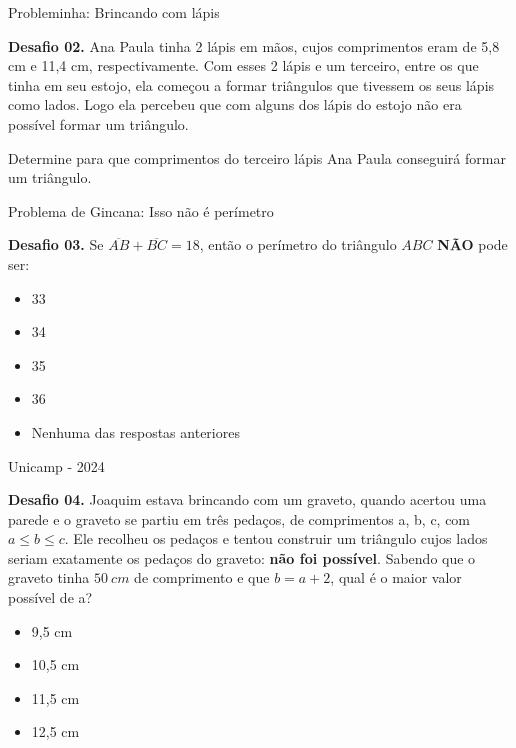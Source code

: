 \documentclass[12pt]{beamer}
\begin{document}
\begin{frame}{Probleminha: Brincando com lápis}
	
	\begin{exampleblock}{\textbf{Desafio 02.}}
		\justifying
		Ana Paula tinha 2 lápis em mãos, cujos comprimentos eram de 5,8 cm e 11,4 cm, respectivamente. Com esses 2 lápis e um terceiro, entre os que tinha em seu estojo, ela começou a formar triângulos que tivessem os seus lápis como lados. Logo ela percebeu que com alguns dos lápis do estojo não era possível formar um triângulo. 
		
		\vspace{2mm} 
		
		Determine para que comprimentos do terceiro lápis Ana Paula conseguirá formar um triângulo.
	\end{exampleblock}
	
\end{frame}

\begin{frame}{Problema de Gincana: Isso não é perímetro}
	\begin{exampleblock}{\textbf{Desafio 03.}}
		Se $\overline{AB}+\overline{BC}=18$, então o perímetro do triângulo $ABC$ \textbf{NÃO} pode ser:
		
		\begin{itemize}
			\item [a)] 33
			\item [b)] 34
			\item [c)] 35
			\item [d)] 36
			\item [e)] Nenhuma das respostas anteriores
		\end{itemize}
	\end{exampleblock}
	
\end{frame}


\begin{frame}{Unicamp - 2024}

    \begin{exampleblock}{\textbf{Desafio 04.}}
        \justifying
        Joaquim estava brincando com um graveto, quando acertou uma parede e o graveto se partiu em três pedaços, de comprimentos a, b, c, com $a \leq b \leq c$. Ele recolheu os pedaços e tentou construir um triângulo cujos lados seriam exatamente os pedaços do graveto: \textbf{não foi possível}. Sabendo que o graveto tinha $50\ cm$ de comprimento e que $b = a + 2$, qual é o maior valor possível de a?

        \begin{itemize}
        \item [a)] 9,5 cm
        \item [b)] 10,5 cm
        \item [c)] 11,5 cm %
        \item [d)] 12,5 cm
    \end{itemize}

    \end{exampleblock}
   
\end{frame}
\end{document}

